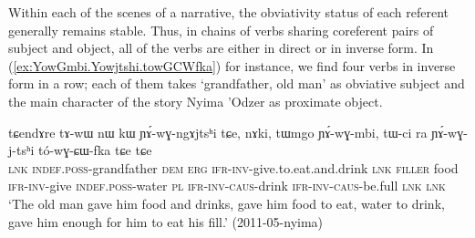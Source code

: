Within each of the scenes of a narrative, the obviativity status of each referent generally remains stable. Thus, in chains of verbs sharing coreferent pairs of subject and object, all of the verbs are either in direct or in inverse form. In (\ref{ex:YowGmbi.Yowjtshi.towGCWfka}) for instance, we find four verbs in inverse form in a row; each of them takes  `grandfather, old man' as obviative subject and the main character of the story Nyima 'Odzer as proximate object.

\begin{exe}
\ex \label{ex:YowGmbi.Yowjtshi.towGCWfka}
\gll tɕendɤre tɤ-wɯ nɯ kɯ ɲɤ́-wɣ-ngɤjtsʰi tɕe, nɤki, tɯmgo ɲɤ́-wɣ-mbi, tɯ-ci ra ɲɤ́-wɣ-j-tsʰi tó-wɣ-ɕɯ-fka tɕe tɕe \\
\textsc{lnk} \textsc{indef}.\textsc{poss}-grandfather \textsc{dem} \textsc{erg} \textsc{ifr}-\textsc{inv}-give.to.eat.and.drink \textsc{lnk} \textsc{filler} food \textsc{ifr}-\textsc{inv}-give \textsc{indef}.\textsc{poss}-water \textsc{pl} \textsc{ifr}-\textsc{inv}-\textsc{caus}-drink \textsc{ifr}-\textsc{inv}-\textsc{caus}-be.full \textsc{lnk} \textsc{lnk} \\
\glt `The old man gave him food and drinks, gave him food to eat, water to drink, gave him enough for him to eat his fill.' (2011-05-nyima)
\end{exe}


